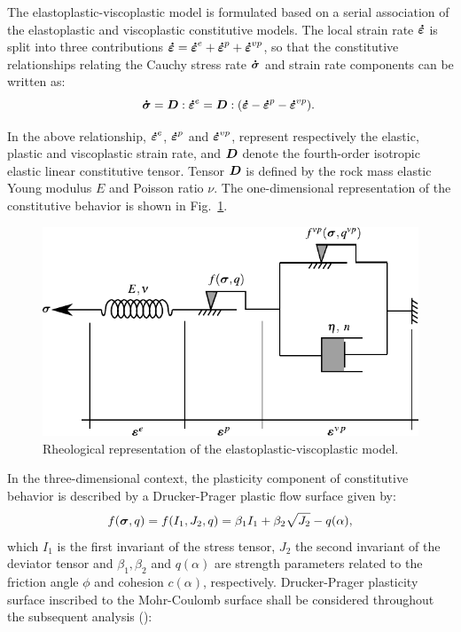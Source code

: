 \documentclass[Journal,letterpaper, NoLists,SectionNumbers]{ascelike-new}
\begin{document}
The elastoplastic-viscoplastic model is formulated based on a serial association of the elastoplastic and viscoplastic constitutive models. The local strain rate $\boldsymbol{\dot{\varepsilon}}$ is split into three contributions $\boldsymbol{\dot{\varepsilon}} = \boldsymbol{\dot{\varepsilon}}^{e} + \boldsymbol{\dot{\varepsilon}}^{p} + \boldsymbol{\dot{\varepsilon}}^{vp}$, so that the constitutive relationships relating the Cauchy stress rate $\boldsymbol{\dot{\sigma}}$ and strain rate components can be written as:
\begin{equation} \label{eq_constitutive_relationship_epvp}
	\boldsymbol{\dot{\sigma}} = \boldsymbol{D} : \boldsymbol{\dot{\varepsilon}}^{e} = \boldsymbol{D} : (\boldsymbol{\dot{\varepsilon}} - \boldsymbol{\dot{\varepsilon}}^{p} - \boldsymbol{\dot{\varepsilon}}^{vp}).\;
\end{equation}

In the above relationship, $\boldsymbol{\dot{\varepsilon}}^{e}$, $\boldsymbol{\dot{\varepsilon}}^{p}$ and $\boldsymbol{\dot{\varepsilon}}^{vp}$, represent respectively the elastic, plastic and viscoplastic strain rate, and $\boldsymbol{D}$ denote the fourth-order isotropic elastic linear constitutive tensor. Tensor $\boldsymbol{D}$ is defined by the rock mass elastic Young modulus $E$ and Poisson ratio $\nu$. The one-dimensional representation of the constitutive behavior is shown in Fig.~\ref{reological_scheme}.
\begin{figure}[h!]
	\centering
	\includegraphics[scale=1]{Rheological representation.pdf}
	\caption{Rheological representation of the elastoplastic-viscoplastic model.}
	\label{reological_scheme}
\end{figure}
In the three-dimensional context, the plasticity component of constitutive behavior is described by a Drucker-Prager plastic flow surface given by:
\begin{equation}
	\label{eq:f_Drucker_Prager}
	f(\boldsymbol{\sigma},q) = f(I_1,J_2,q) = \beta_1 I_1 +\beta_2 \sqrt{J_2}-q(\alpha),
\end{equation}
which $I_1$ is the first invariant of the stress tensor, $J_2$ the second invariant of the deviator tensor and $\beta_1, \beta_2$ and $q(\alpha)$ are strength parameters related to the friction angle $\phi$ and cohesion $c(\alpha)$, respectively. Drucker-Prager plasticity surface inscribed to the Mohr-Coulomb surface shall be considered throughout the subsequent analysis ():
\end{document}
